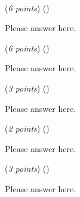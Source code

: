 \documentclass{template}
\begin{document}
\newpage

\begin{problem}
~\newline
~\newline


\begin{subproblem}
(\textit{6 points}) (\scoretextemoji{}\scorecodeemoji{})


\end{subproblem}

\begin{solution}
Please answer here.
\end{solution}

\begin{subproblem}
(\textit{6 points}) (\scoretextemoji{}\scorecodeemoji{})


\end{subproblem}

\begin{solution}
Please answer here.
\end{solution}

\begin{subproblem}
(\textit{3 points}) (\scoreplotemoji{})


\end{subproblem}

\begin{solution}
Please answer here.
\end{solution}

\begin{subproblem}
(\textit{2 points}) (\scoretextemoji{})


\end{subproblem}

\begin{solution}
Please answer here.
\end{solution}

\begin{subproblem}
(\textit{3 points}) (\scoreplotemoji{})


\end{subproblem}

\begin{solution}
Please answer here.
\end{solution}
\end{problem}
\end{document}
